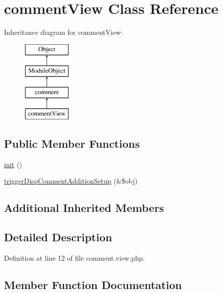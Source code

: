 \hypertarget{classcommentView}{}\section{comment\+View Class Reference}
\label{classcommentView}
Inheritance diagram for comment\+View\+:\begin{figure}[H]
\begin{center}
\leavevmode
\includegraphics[height=4.000000cm]{classcommentView}
\end{center}
\end{figure}
\subsection*{Public Member Functions}
\begin{DoxyCompactItemize}
\item 
\hyperlink{classcommentView_a07590a352da4831233828e9521812419}{init} ()
\item 
\hyperlink{classcommentView_ad2504c48d3411458dcdd88d1d681aba7}{trigger\+Disp\+Comment\+Addition\+Setup} (\&\$obj)
\end{DoxyCompactItemize}
\subsection*{Additional Inherited Members}


\subsection{Detailed Description}


Definition at line 12 of file comment.\+view.\+php.



\subsection{Member Function Documentation}
\mbox{\label{classcommentView_a07590a352da4831233828e9521812419}} 
